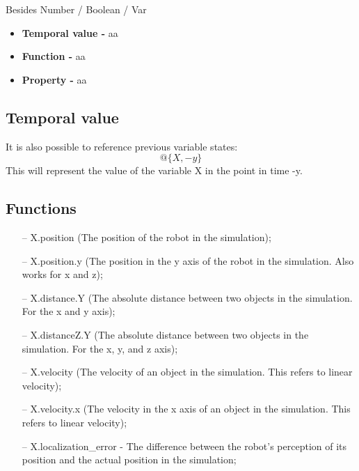 Besides Number / Boolean / Var

\begin{itemize}
\item \textbf{Temporal value -} aa
\item \textbf{Function -} aa
\item \textbf{Property -} aa
\end{itemize}

\subsection{Temporal value}

It is also possible to reference previous variable states:
\begin{equation}
@\{X, -y\}
\end{equation}
This will represent the value of the variable X in the point in time -y.

\subsection{Functions}

\begin{itemize}
\item[--] X.position (The position of the robot in the simulation);
\item[--] X.position.y (The position in the y axis of the robot in the simulation. Also works for x and z);
\item[--] X.distance.Y (The absolute distance between two objects in the simulation. For the x and y axis);
\item[--] X.distanceZ.Y (The absolute distance between two objects in the simulation. For the x, y, and z axis);
\item[--] X.velocity (The velocity of an object in the simulation. This refers to linear velocity);
\item[--] X.velocity.x (The velocity in the x axis of an object in the simulation. This refers to linear velocity);
\item[--] X.localization\_error - The difference between the robot's perception of its position and the actual position in the simulation;
\end{itemize}

